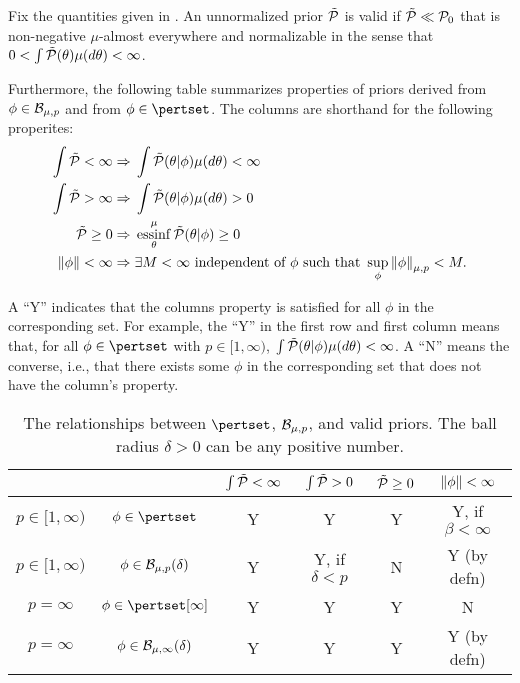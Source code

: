 \begin{lem}
%
Fix the quantities given in .  An unnormalized prior
$\tilde{\mathcal{P}}$ is valid if $\tilde{\mathcal{P}} \ll \mathcal{P}_{0}$ that is non-negative $\mu$-almost
everywhere and normalizable in the sense that $0 < \int \tilde{\mathcal{P}}(\theta)
\mu(d\theta) < \infty$.

Furthermore, the following table summarizes properties of priors derived from
$\phi \in \mathcal{B}_{\mu,p}$ and from $\phi \in \pertset$.  The columns are
shorthand for the following properites:
%
\begin{align*}
%
\int \ptil < \infty \Rightarrow{}&
    \int \ptil(\theta \vert \phi) \mu(d\theta) < \infty\\
\int \ptil > \infty \Rightarrow{}&
    \int \ptil(\theta \vert \phi) \mu(d\theta) > 0\\
\ptil \ge 0 \Rightarrow{}&
    \essinf_\theta^\mu \ptil(\theta \vert \phi) \ge 0\\
\norm{\phi} < \infty \Rightarrow{}&
    \exists M < \infty \textrm{ independent of }\phi\textrm{ such that }
    \sup_\phi \norm{\phi}_{\mu,p} < M.
%
\end{align*}

A ``Y'' indicates that the columns property is satisfied for all $\phi$
in the corresponding set.  For example, the ``Y'' in the first row and first
column means that, for all $\phi \in \pertset$ with $p \in [1, \infty)$,
$\int \tilde{\mathcal{P}}(\theta \vert \phi) \mu(d\theta) < \infty$.  A ``N'' means the
converse, i.e., that there exists some $\phi$ in the corresponding set
that does not have the column's property.

\begin{table}[h!]
\begin{centering}
\begin{tabular}{cccccc}
    && $\int \tilde{\mathcal{P}} < \infty$
    & $\int \tilde{\mathcal{P}} > 0$
    & $\tilde{\mathcal{P}} \ge 0$
    & $\left\Vert\phi\right\Vert < \infty$\\[0.5em] \hline
$p \in [1, \infty)$   &     $\phi \in \pertset$ &
    Y & Y & Y & Y, if $\beta < \infty$ \\ \hline
$p \in [1, \infty)$   &     $\phi \in \mathcal{B}_{\mu,p}(\delta)$ &
    Y & Y, if $\delta < p$ & N & Y (by defn) \\ \hline
$p = \infty$   &     $\phi \in \pertset[\infty]$ &
    Y & Y & Y & N \\ \hline
$p = \infty$   &     $\phi \in \mathcal{B}_{\mu,\infty}(\delta)$ &
    Y & Y & Y & Y (by defn) \\ \hline
\end{tabular}
\caption{The relationships between $\pertset$, $\mathcal{B}_{\mu,p}$, and valid priors.
The ball radius $\delta > 0$ can be any positive number.}
\end{centering}
\end{table}


\end{lem}
